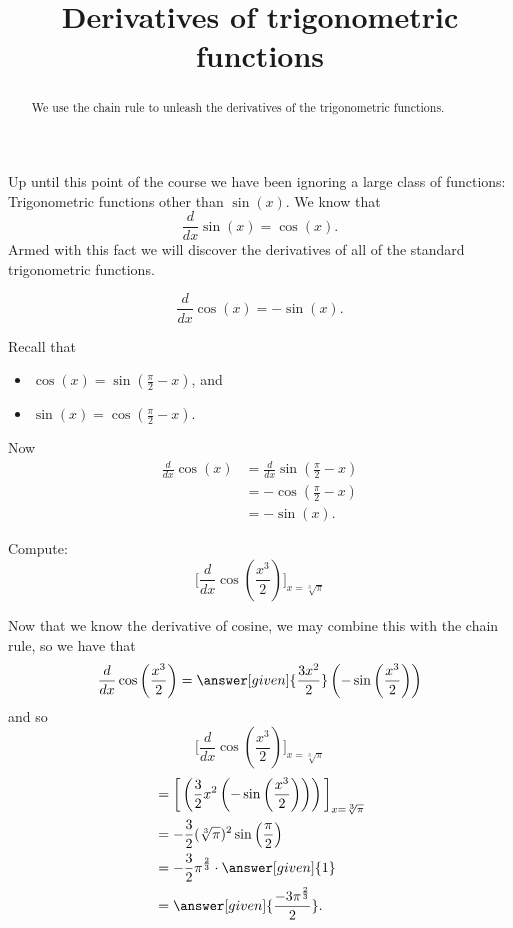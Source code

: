 \documentclass{ximera}
\title[Dig-In:]{Derivatives of trigonometric functions}
\begin{document}
\begin{abstract}
  We use the chain rule to unleash the derivatives of the
  trigonometric functions.
\end{abstract}
\maketitle

Up until this point of the course we have been ignoring a large class
of functions: Trigonometric functions other than $\sin(x)$. We know
that
\[
\frac{d}{dx} \sin(x) = \cos(x).
\]
Armed with this fact we will discover the derivatives of all of the
standard trigonometric functions.

\begin{theorem}
\[
\frac{d}{dx} \cos(x) = -\sin(x).
\]
\begin{explanation}
Recall that
\begin{itemize}
\item $\cos(x) = \sin\left(\frac{\pi}{2}-x\right)$, and
\item $\sin(x) = \cos\left(\frac{\pi}{2}-x\right)$.
\end{itemize}
Now
\begin{align*}
\frac{d}{dx} \cos(x) &= \frac{d}{dx} \sin\left(\frac{\pi}{2}-x\right)\\
&=-\cos\left(\frac{\pi}{2}-x\right) \\
&= -\sin(x).
\end{align*}
\end{explanation}
\end{theorem}

\begin{example}
Compute:
\[
\bigg[ \frac{d}{dx} \cos \left( \frac{x^3}{2} \right) \bigg]_{x=\sqrt[3]{\pi}}
\]
\begin{explanation}
Now that we know the derivative of cosine, we may combine this with the
chain rule, so we have that
\[
\frac{d}{dx} \cos \left( \frac{x^3}{2} \right) = \answer[given]{\frac{3 x^2}{2}} \left(- \sin \left( \frac{x^3}{2} \right) \right)
\]
and so
\[
\bigg[ \frac{d}{dx} \cos \left( \frac{x^3}{2} \right) \bigg]_{x=\sqrt[3]{\pi}}
\]
\begin{align*}
  &= \bigg[ \left( \frac{3}{2} x^2 \left(- \sin \left( \frac{x^3}{2}
    \right) \right) \right) \bigg]_{x=\sqrt[3]{\pi}} \\
  &= - \frac{3}{2}(\sqrt[3]{\pi})^2 \sin \left( \frac{\pi}{2} \right) \\
  &= -\frac{3}{2} \pi^{\frac{2}{3}} \cdot \answer[given]{1} \\
  &=\answer[given]{\frac{-3 \pi^{\frac{2}{3}}}{2}}.
\end{align*}
\end{explanation}
\end{example}
\end{document}
